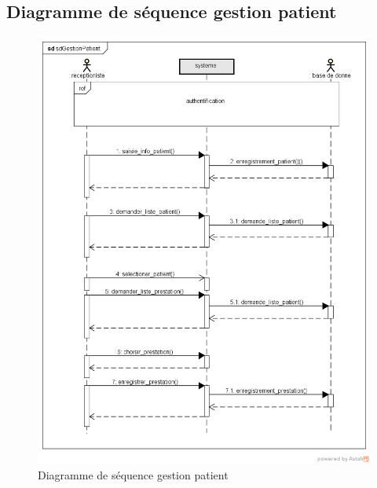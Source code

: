 	  \subsection{Diagramme de séquence gestion patient}
	  \begin{figure}[h]
	  \includegraphics[scale=0.6]{Chapitre2/images/sd_gererpatient}
\caption{Diagramme de  séquence gestion patient}
	  \end{figure}
	  
	  \newpage
	  

